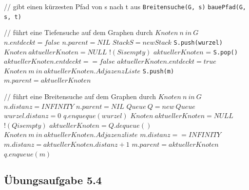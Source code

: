 \documentclass{article}
\begin{document}
\begin{codebox}
	\zi // gibt einen kürzesten Pfad von s nach t aus
    \li \texttt{Breitensuche(G, s)}
    \li \Return \texttt{bauePfad(G, s, t)}
\end{codebox}

\begin{codebox}
	\zi // führt eine Tiefensuche auf dem Graphen durch
    \li \For $Knoten~n~in~G$
    	\Indentmore
        \li $n.entdeckt = false$
        \li $n.parent = NIL$
    \End
    \li $Stack S = new Stack$
    \li \texttt{S.push(wurzel)}
    \li $Knoten~aktuellerKnoten = NULL$
    \li \While $!(S is empty)$
    	\Indentmore
        \li $aktuellerKnoten$ = \texttt{S.pop()}
        \li \If $aktuellerKnoten.entdeckt == false$
        	\Indentmore
            \li $aktuellerKnoten.entdeckt = true$
        \End
	    \li \For $Knoten~m~in~aktuellerKnoten.AdjazenzListe$
	    	\Indentmore
	        \li \texttt{S.push(m)}
	    \End
		\li $m.parent = aktuellerKnoten$
	\End
\end{codebox}

\begin{codebox}
	\zi // führt eine Breitensuche auf dem Graphen durch
    \li \For $Knoten~n~in~G$
    	\Indentmore
        \li $n.distanz = INFINITY$
	    \li $n.parent = NIL$
	\End
    \li $Queue~Q = new~Queue$
    \li $wurzel.distanz = 0$
    \li $q.enqueque(wurzel)$
    \li $Knoten~aktuellerKnoten = NULL$
    \li \While $!(Q is empty)$
    	\Indentmore
        \li $aktuellerKnoten = Q.dequeue()$
        \li \For $Knoten~m~in~aktuellerKnoten.Adjazenzliste$
        	\Indentmore
            \li \If $m.distanz == INFINITY$
	            \Indentmore
                \li $m.distanz = aktuellerKnoten.distanz + 1$
                \li $m.parent = aktuellerKnoten$
                \li $q.enqueue(m)$
            \End
        \End
    \End
\end{codebox}



\subsection*{Übungsaufgabe 5.4}
\label{ssec:5.4}
\begin{flushright}
\begin{Large}
[~~~~\string| ~~4~]
\end{Large}
\end{flushright}
\end{document}
